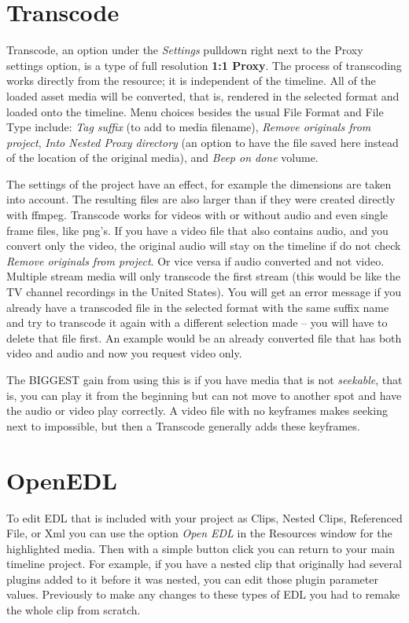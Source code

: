 \section{Transcode}%
\label{sec:transcode}

Transcode, an option under the \textit{Settings} pulldown right next to the Proxy settings option, is a type of full resolution \textbf{1:1 Proxy}.
The process of transcoding works directly from the resource; it is independent of the timeline. 
All of the loaded asset media will be converted, that is, rendered in the selected format and loaded onto the timeline. 
Menu choices besides the usual File Format and File Type include: \textit{Tag suffix} (to add to media filename), \textit{Remove originals from project}, \textit{Into Nested Proxy directory} (an option to have the file saved here instead of the location of the original media), and \textit{Beep on done} volume.

The settings of the project have an effect, for example the dimensions are taken into account. The resulting files are also larger than if they were created directly with ffmpeg.
Transcode works for videos with or without audio and even single frame files, like png's.
If you have a video file that also contains audio, and you convert only the video, the original audio will stay on the timeline if do not check \textit{Remove originals from project}. Or vice versa if audio converted and not video.
Multiple stream media will only transcode the first stream (this would be like the TV channel recordings in the United States).
You will get an error message if you already have a transcoded file in the selected format with the same suffix name and try to transcode it again with a different selection made -- you will have to delete that file first. An example would be
an already converted file that has both video and audio and now you request video only. 

The BIGGEST gain from using this is if you have media that is not \textit{seekable}, that is, you can play it from the beginning but can not move to another spot and have the audio or video play correctly. A video file with no keyframes makes seeking next to impossible, but then a Transcode generally adds these keyframes. 


\section{OpenEDL}%
\label{sec:openedl}

To edit EDL that is included with your project as Clips, Nested
Clips, Referenced File, or Xml you can use the option \textit{Open
	EDL} in the Resources window for the highlighted media.  Then with
a simple button click you can return to your main timeline project.
For example, if you have a nested clip that originally had several
plugins added to it before it was nested, you can edit those plugin
parameter values. Previously to make any changes to these types of
EDL you had to remake the whole clip from scratch.

